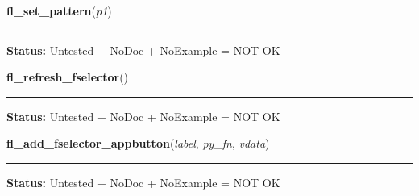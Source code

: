     \vspace{0.5ex}

\hspace{.8\funcindent}\begin{boxedminipage}{\funcwidth}

    \raggedright \textbf{fl\_set\_pattern}(\textit{p1})

    \vspace{-1.5ex}

    \rule{\textwidth}{0.5\fboxrule}
\setlength{\parskip}{2ex}
\setlength{\parskip}{1ex}
\textbf{Status:} Untested + NoDoc + NoExample = NOT OK



    \end{boxedminipage}

    \label{xformslib:library:fl_refresh_fselector}

    \vspace{0.5ex}

\hspace{.8\funcindent}\begin{boxedminipage}{\funcwidth}

    \raggedright \textbf{fl\_refresh\_fselector}()

    \vspace{-1.5ex}

    \rule{\textwidth}{0.5\fboxrule}
\setlength{\parskip}{2ex}
\setlength{\parskip}{1ex}
\textbf{Status:} Untested + NoDoc + NoExample = NOT OK



    \end{boxedminipage}

    \label{xformslib:library:fl_add_fselector_appbutton}

    \vspace{0.5ex}

\hspace{.8\funcindent}\begin{boxedminipage}{\funcwidth}

    \raggedright \textbf{fl\_add\_fselector\_appbutton}(\textit{label}, \textit{py\_fn}, \textit{vdata})

    \vspace{-1.5ex}

    \rule{\textwidth}{0.5\fboxrule}
\setlength{\parskip}{2ex}
\setlength{\parskip}{1ex}
\textbf{Status:} Untested + NoDoc + NoExample = NOT OK



    \end{boxedminipage}

